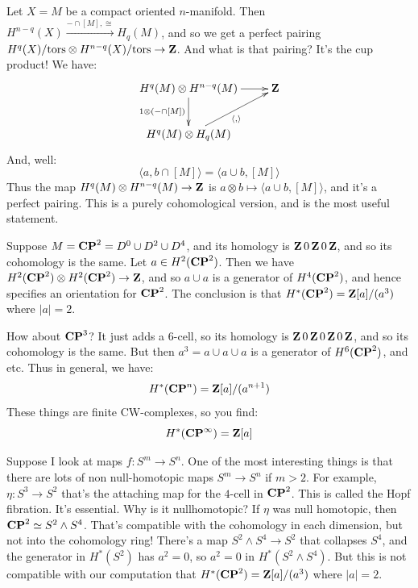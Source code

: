 Let $X=M$ be a compact oriented $n$-manifold. Then $H^{n-q}(X)\xrightarrow{-\cap[M],\cong}H_q(M)$, and so we get a perfect pairing $H^q(X)/\mathrm{tors}\otimes H^{n-q}(X)/\mathrm{tors}\to\mathbf Z$. And what is that pairing? It's the cup product! We have:
\begin{equation*}
\xymatrix{
	H^q(M)\otimes H^{n-q}(M)\ar[r]\ar[d]_{1\otimes(-\cap [M])} & \Z\\
	H^q(M)\otimes H_q(M)\ar[ur]_{\langle,\rangle}
}
\end{equation*}
And, well:
\begin{equation*}
\langle a,b\cap [M]\rangle = \langle a\cup b,[M]\rangle
\end{equation*}
Thus the map $H^q(M)\otimes H^{n-q}(M)\to \mathbf Z$ is $a\otimes b\mapsto\langle a\cup b,[M]\rangle$, and it's a perfect pairing. This is a purely cohomological version, and is the most useful statement.
\begin{example}
Suppose $M=\mathbf{CP}^2=D^0\cup D^2\cup D^4$, and its homology is $\mathbf Z \, 0 \, \mathbf Z \, 0\, \mathbf Z$, and so its cohomology is the same. Let $a\in H^2(\mathbf{CP}^2)$. Then we have $H^2(\mathbf{CP}^2)\otimes H^2(\mathbf{CP}^2)\to \mathbf Z$, and so $a\cup a$ is a generator of $H^4(\mathbf{CP}^2)$, and hence specifies an orientation for $\mathbf{CP}^2$. The conclusion is that $H^\ast(\mathbf{CP}^2)=\mathbf Z[a]/(a^3)$ where $|a|=2$.

How about $\mathbf{CP}^3$? It just adds a $6$-cell, so its homology is $\mathbf Z \, 0 \, \mathbf Z \, 0\, \mathbf Z \, 0 \, \mathbf Z$, and so its cohomology is the same. But then $a^3=a\cup a\cup a$ is a generator of $H^6(\mathbf{CP}^2)$, and etc. Thus in general, we have:
$$H^\ast(\mathbf{CP}^n)=\mathbf Z[a]/(a^{n+1})$$
These things are finite CW-complexes, so you find:
\begin{equation}
H^\ast(\mathbf{CP}^\infty)=\mathbf Z[a]
\end{equation}
\end{example}
\begin{example}
Suppose I look at maps $f:S^m\to S^n$. One of the most interesting things is that there are lots of non null-homotopic maps $S^m\to S^n$ if $m>2$. For example, $\eta:S^3\to S^2$ that's the attaching map for the $4$-cell in $\mathbf{CP}^2$. This is called the Hopf fibration. It's essential. Why is it nullhomotopic? If $\eta$ was null homotopic, then $\mathbf{CP}^2\simeq S^2\wedge S^4$. That's compatible with the cohomology in each dimension, but not into the cohomology ring! There's a map $S^2\wedge S^4\to S^2$ that collapses $S^4$, and the generator in $H^\ast(S^2)$ has $a^2=0$, so $a^2=0$ in $H^\ast(S^2\wedge S^4)$. But this is not compatible with our computation that $H^\ast(\mathbf{CP}^2)=\mathbf Z[a]/(a^3)$ where $|a|=2$.
\end{example}

